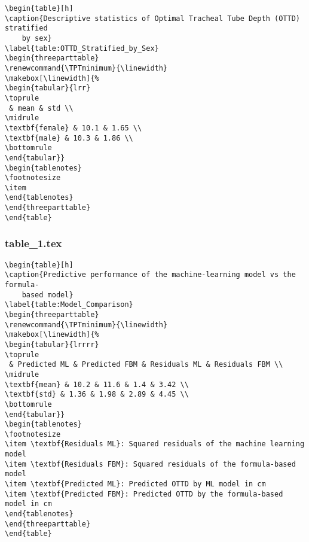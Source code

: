 \documentclass[11pt]{article}
\begin{document}
\begin{Verbatim}[tabsize=4]
\begin{table}[h]
\caption{Descriptive statistics of Optimal Tracheal Tube Depth (OTTD) stratified
	by sex}
\label{table:OTTD_Stratified_by_Sex}
\begin{threeparttable}
\renewcommand{\TPTminimum}{\linewidth}
\makebox[\linewidth]{%
\begin{tabular}{lrr}
\toprule
 & mean & std \\
\midrule
\textbf{female} & 10.1 & 1.65 \\
\textbf{male} & 10.3 & 1.86 \\
\bottomrule
\end{tabular}}
\begin{tablenotes}
\footnotesize
\item
\end{tablenotes}
\end{threeparttable}
\end{table}

\end{Verbatim}

\subsubsection*{table\_1.tex}

\begin{Verbatim}[tabsize=4]
\begin{table}[h]
\caption{Predictive performance of the machine-learning model vs the formula-
	based model}
\label{table:Model_Comparison}
\begin{threeparttable}
\renewcommand{\TPTminimum}{\linewidth}
\makebox[\linewidth]{%
\begin{tabular}{lrrrr}
\toprule
 & Predicted ML & Predicted FBM & Residuals ML & Residuals FBM \\
\midrule
\textbf{mean} & 10.2 & 11.6 & 1.4 & 3.42 \\
\textbf{std} & 1.36 & 1.98 & 2.89 & 4.45 \\
\bottomrule
\end{tabular}}
\begin{tablenotes}
\footnotesize
\item \textbf{Residuals ML}: Squared residuals of the machine learning model
\item \textbf{Residuals FBM}: Squared residuals of the formula-based model
\item \textbf{Predicted ML}: Predicted OTTD by ML model in cm
\item \textbf{Predicted FBM}: Predicted OTTD by the formula-based model in cm
\end{tablenotes}
\end{threeparttable}
\end{table}

\end{Verbatim}
\end{document}
